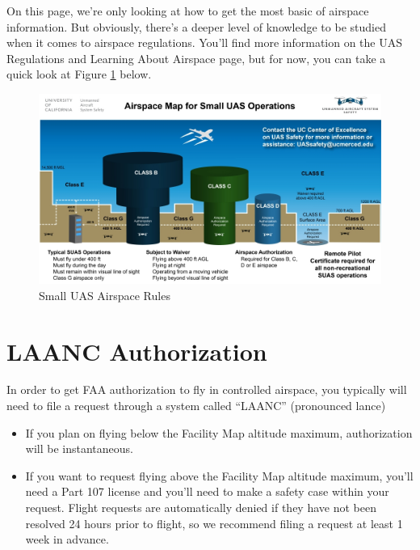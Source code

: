 \documentclass[
  12pt,
]{book}
\providecommand{\tightlist}{%
  \setlength{\itemsep}{0pt}\setlength{\parskip}{0pt}}
\begin{document}
On this page, we're only looking at how to get the most basic of airspace information. But obviously, there's a deeper level of knowledge to be studied when it comes to airspace regulations. You'll find more information on the UAS Regulations and Learning About Airspace page, but for now, you can take a quick look at Figure \ref{fig:SUAS-sim-regs} below.

\begin{figure}

{\centering \includegraphics[width=0.9\linewidth]{images/SUAS_airspace_map} 

}

\caption{Small UAS Airspace Rules}\label{fig:SUAS-sim-regs}
\end{figure}

\hypertarget{LAANC}{%
\section{LAANC Authorization}\label{LAANC}}

In order to get FAA authorization to fly in controlled airspace, you typically will need to file a request through a system called ``LAANC'' (pronounced lance)

\begin{itemize}
\tightlist
\item
  If you plan on flying below the Facility Map altitude maximum, authorization will be instantaneous.
\item
  If you want to request flying above the Facility Map altitude maximum, you'll need a Part 107 license and you'll need to make a safety case within your request. Flight requests are automatically denied if they have not been resolved 24 hours prior to flight, so we recommend filing a request at least 1 week in advance.
\end{itemize}
\end{document}
